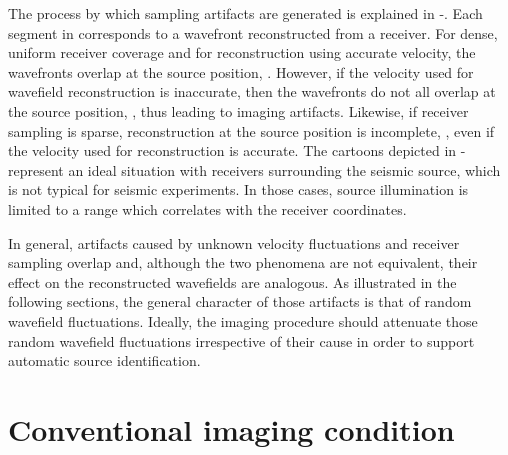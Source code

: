 The process by which sampling artifacts are generated is explained in
-. Each segment in  corresponds
to a wavefront reconstructed from a receiver. For dense, uniform
 receiver coverage and for reconstruction
using accurate velocity, the wavefronts overlap at the source
position, .  However, if the velocity used for
wavefield reconstruction is inaccurate, then the wavefronts do not all
overlap at the source position, , thus leading to imaging
artifacts. Likewise, if receiver sampling is sparse, reconstruction at
the source position is incomplete, , even if the velocity
used for reconstruction is accurate. The cartoons depicted in
- represent an ideal situation with receivers
surrounding the seismic source, which is not typical for seismic
experiments. In those cases, source illumination is limited to a range
which correlates with the receiver coordinates.

In general, artifacts caused by unknown velocity fluctuations and
receiver sampling overlap and, although the two phenomena are not
equivalent, their effect on the reconstructed wavefields are
analogous. As illustrated in the following sections, the general
character of those artifacts is that of random wavefield
fluctuations. Ideally, the imaging procedure should attenuate those
random wavefield fluctuations irrespective of their cause in order to
support automatic source identification.

\section{Conventional imaging condition}

